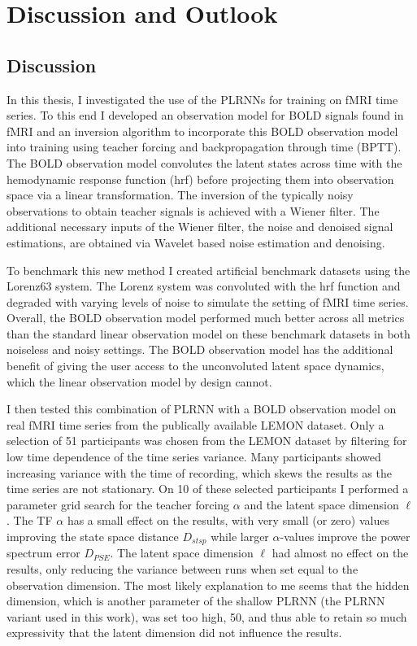 \FloatBarrier
\chapter{Discussion and Outlook} 

\section{Discussion}

In this thesis, I investigated the use of the PLRNNs for training on fMRI time series. To this end I developed an observation model for BOLD signals found in fMRI and an inversion 
algorithm to incorporate this BOLD observation model into training using teacher forcing and backpropagation through time (BPTT). The BOLD observation model convolutes
the latent states across time with the hemodynamic response function (hrf) before projecting them into observation space via a linear transformation. 
The inversion of the typically noisy observations to obtain teacher signals is achieved with a Wiener filter. 
The additional necessary inputs of the Wiener filter, the noise and denoised signal estimations, are obtained via Wavelet based noise estimation and denoising.

To benchmark this new method I created artificial benchmark datasets using the Lorenz63 system. The Lorenz system was convoluted with the hrf function and degraded with 
varying levels of noise to simulate the setting of fMRI time series. Overall, the BOLD observation model performed much better across all metrics than the standard linear observation
model on these benchmark datasets in both noiseless and noisy settings. The BOLD observation model has the additional benefit of giving the user access to the unconvoluted latent 
space dynamics, which the linear observation model by design cannot. 

I then tested this combination of PLRNN with a BOLD observation model on real fMRI time series from the publically available LEMON dataset.
Only a selection of 51 participants was chosen from the LEMON dataset by filtering for low time dependence of the time series variance. Many participants showed 
increasing variance with the time of recording, which skews the results as the time series are not stationary. On 10 of these selected participants I performed a parameter 
grid search for the teacher forcing $\alpha$ and the latent space dimension $\ell$. The TF $\alpha$ has a small effect on the results, with very small (or zero) values 
improving the state space distance $D_{stsp}$ while larger $\alpha$-values improve the power spectrum error $D_{PSE}$. The latent space dimension $\ell$ had almost no effect on the 
results, only reducing the variance between runs when set equal to the observation dimension. The most likely explanation to me seems that the hidden dimension, which is another 
parameter of the shallow PLRNN (the PLRNN variant used in this work), was set too high, 50, and thus able to retain so much expressivity that the latent dimension did not influence
the results. 

